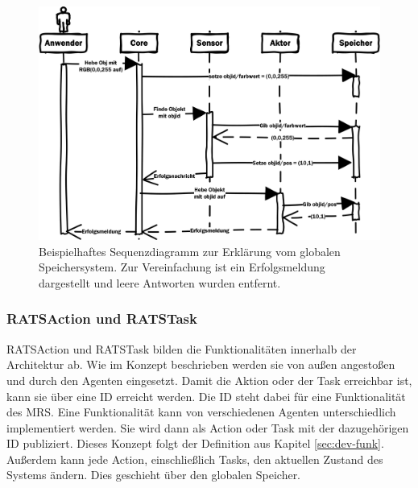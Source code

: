 \begin{figure}
	\centering
	\includegraphics[scale=1.0]{fig/seqspeicher}
	\caption[RATS globaler Speicher]{Beispielhaftes Sequenzdiagramm zur Erklärung vom globalen Speichersystem. Zur Vereinfachung ist ein Erfolgsmeldung dargestellt und leere Antworten wurden entfernt.}
	\label{fig:seqspeicher}
\end{figure}

\subsubsection{RATSAction und RATSTask}
RATSAction und RATSTask bilden die Funktionalitäten innerhalb der Architektur ab. Wie im Konzept beschrieben werden sie von außen angestoßen und durch den Agenten eingesetzt. Damit die Aktion oder der Task erreichbar ist, kann sie über eine ID erreicht werden. Die ID steht dabei für eine Funktionalität des MRS. Eine Funktionalität kann von verschiedenen Agenten unterschiedlich implementiert werden. Sie wird dann als Action oder Task mit der dazugehörigen ID publiziert. Dieses Konzept folgt der Definition aus Kapitel \ref{sec:dev-funk}. Außerdem kann jede Action, einschließlich Tasks, den aktuellen Zustand des Systems ändern. Dies geschieht über den globalen Speicher. 

